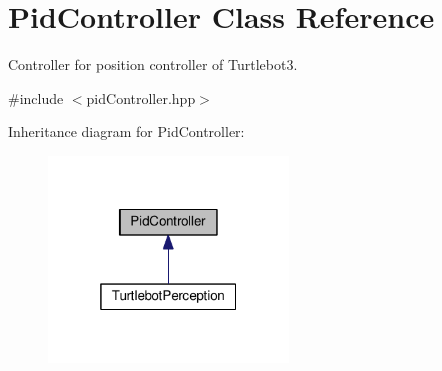 \hypertarget{classPidController}{}\section{Pid\+Controller Class Reference}
\label{classPidController}


Controller for position controller of Turtlebot3.  




{\ttfamily \#include $<$pid\+Controller.\+hpp$>$}



Inheritance diagram for Pid\+Controller\+:
\nopagebreak
\begin{figure}[H]
\begin{center}
\leavevmode
\includegraphics[width=181pt]{classPidController__inherit__graph}
\end{center}
\end{figure}
